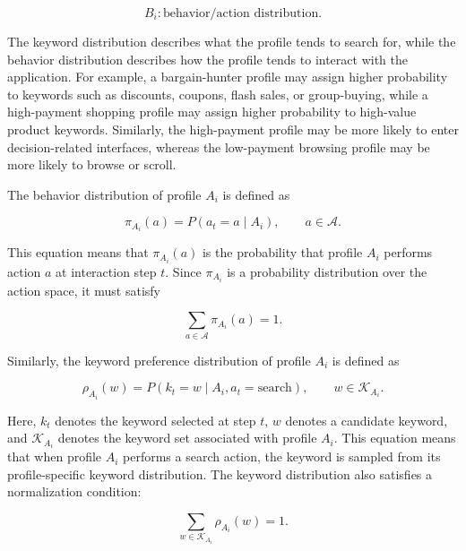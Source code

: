 \begin{equation}
B_i : \text{behavior/action distribution}.
\label{eq:behavior-distribution-text}
\end{equation}

The keyword distribution describes what the profile tends to search for, while the behavior distribution describes how the profile tends to interact with the application. For example, a bargain-hunter profile may assign higher probability to keywords such as discounts, coupons, flash sales, or group-buying, while a high-payment shopping profile may assign higher probability to high-value product keywords. Similarly, the high-payment profile may be more likely to enter decision-related interfaces, whereas the low-payment browsing profile may be more likely to browse or scroll.

The behavior distribution of profile $A_i$ is defined as

\begin{equation}
\pi_{A_i}(a)
=
P(a_t = a \mid A_i),
\qquad a \in \mathcal{A}.
\label{eq:behavior-probability}
\end{equation}

This equation means that $\pi_{A_i}(a)$ is the probability that profile $A_i$ performs action $a$ at interaction step $t$. Since $\pi_{A_i}$ is a probability distribution over the action space, it must satisfy

\begin{equation}
\sum_{a \in \mathcal{A}} \pi_{A_i}(a) = 1.
\label{eq:behavior-normalization}
\end{equation}

Similarly, the keyword preference distribution of profile $A_i$ is defined as

\begin{equation}
\rho_{A_i}(w)
=
P(k_t = w \mid A_i, a_t = \mathrm{search}),
\qquad w \in \mathcal{K}_{A_i}.
\label{eq:keyword-probability}
\end{equation}

Here, $k_t$ denotes the keyword selected at step $t$, $w$ denotes a candidate keyword, and $\mathcal{K}_{A_i}$ denotes the keyword set associated with profile $A_i$. This equation means that when profile $A_i$ performs a search action, the keyword is sampled from its profile-specific keyword distribution. The keyword distribution also satisfies a normalization condition:

\begin{equation}
\sum_{w \in \mathcal{K}_{A_i}} \rho_{A_i}(w) = 1.
\label{eq:keyword-normalization}
\end{equation}

